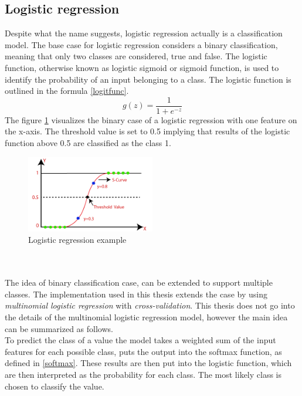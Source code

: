 \subsection{Logistic regression} \label{LogisticRegression}
Despite what the name suggests, logistic regression actually is a classification model. The base case for logistic regression considers a binary classification, meaning that only two classes are considered, true and false. The logistic function, otherwise known as logistic sigmoid or sigmoid function, is used to identify the probability of an input belonging to a class. The logistic function is outlined in the formula \ref{logitfunc}. 
\begin{equation}\label{logitfunc}
    g(z) = \frac{1}{1 + e^{-z}}
\end{equation}
The figure \ref{fig:logitReg} visualizes the binary case of a logistic regression with one feature on the x-axis. The threshold value is set to 0.5 implying that results of the logistic function above 0.5 are classified as the class 1. 
\begin{figure}[h]
      \centering
      \includegraphics[width=0.5\textwidth]{images/logisticReg.png}
      \caption{Logistic regression example \parencite{Logistic19:online} }
      \label{fig:logitReg}
  \end{figure}
\\\\
The idea of binary classification case, can be extended to support multiple classes. The implementation used in this thesis extends the case by using \textit{multinomial logistic regression} with \textit{cross-validation}. This thesis does not go into the details of the multinomial logistic regression model, however the main idea can be summarized as follows.\\
To predict the class of a value the model takes a weighted sum of the input features for each possible class, puts the output into the softmax function, as defined in \ref{softmax}. These results are then put into the logistic function, which are then interpreted as the probability for each class. The most likely class is chosen to classify the value. \\ 

